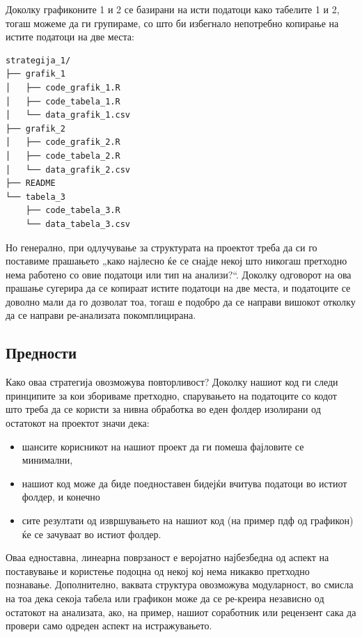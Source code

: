 \documentclass[
]{book}
\providecommand{\tightlist}{%
  \setlength{\itemsep}{0pt}\setlength{\parskip}{0pt}}
\begin{document}
Доколку графиконите 1 и 2 се базирани на исти податоци како табелите 1 и 2, тогаш можеме да ги групираме, со што би избегнало непотребно копирање на истите податоци на две места:

\begin{verbatim}
strategija_1/
├── grafik_1
│   ├── code_grafik_1.R
│   ├── code_tabela_1.R
│   └── data_grafik_1.csv
├── grafik_2
│   ├── code_grafik_2.R
│   ├── code_tabela_2.R
│   └── data_grafik_2.csv
├── README
└── tabela_3
    ├── code_tabela_3.R
    └── data_tabela_3.csv
\end{verbatim}

Но генерално, при одлучување за структурата на проектот треба да си го поставиме прашањето „како најлесно ќе се снајде некој што никогаш претходно нема работено со овие податоци или тип на анализи?{}``. Доколку одговорот на ова прашање сугерира да се копираат истите податоци на две места, и податоците се доволно мали да го дозволат тоа, тогаш е подобро да се направи вишокот отколку да се направи ре-анализата покомплицирана.

\hypertarget{ux43fux440ux435ux434ux43dux43eux441ux442ux438}{%
\subsection{Предности}\label{ux43fux440ux435ux434ux43dux43eux441ux442ux438}}

Како оваа стратегија овозможува повторливост? Доколку нашиот код ги следи принципите за кои збориваме претходно, спарувањето на податоците со кодот што треба да се користи за нивна обработка во еден фолдер изолирани од остатокот на проектот значи дека:

\begin{itemize}
\tightlist
\item
  шансите корисникот на нашиот проект да ги помеша фајловите се минимални,\\
\item
  нашиот код може да биде поедноставен бидејќи вчитува податоци во истиот фолдер, и конечно
\item
  сите резултати од извршувањето на нашиот код (на пример пдф од графикон) ќе се зачуваат во истиот фолдер.
\end{itemize}

Оваа едноставна, линеарна поврзаност е веројатно најбезбедна од аспект на поставување и користење подоцна од некој кој нема никакво претходно познавање. Дополнително, ваквата структура овозможува модуларност, во смисла на тоа дека секоја табела или графикон може да се ре-креира независно од остатокот на анализата, ако, на пример, нашиот соработник или рецензент сака да провери само одреден аспект на истражувањето.
\end{document}

